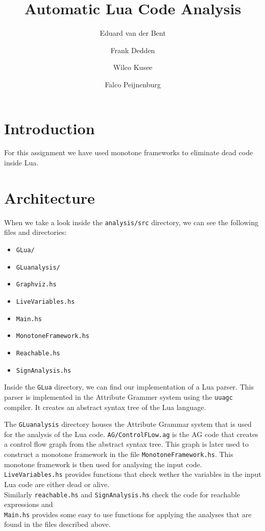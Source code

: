 \documentclass[10pt]{article}
\title{Automatic Lua Code Analysis}
\author{Eduard van der Bent \and Frank Dedden \and Wilco Kusee \and Falco Peijnenburg}
\begin{document}
\maketitle


\section{Introduction}

For this assignment we have used monotone frameworks to eliminate dead code inside Lua.

\section{Architecture} %
When we take a look inside the \texttt{analysis/src} directory, we can see the following files and directories:
\begin{itemize}
	\item \texttt{GLua/}
	\item \texttt{GLuanalysis/}
	\item \texttt{Graphviz.hs}
	\item \texttt{LiveVariables.hs}
	\item \texttt{Main.hs}
	\item \texttt{MonotoneFramework.hs}
	\item \texttt{Reachable.hs}
	\item \texttt{SignAnalysis.hs}
\end{itemize}

Inside the \texttt{GLua} directory, we can find our implementation of a Lua parser. This parser is implemented in the Attribute Grammer system using the \texttt{uuagc} compiler. It creates an abstract syntax tree of the Lua language. %

The \texttt{GLuanalysis} directory houses the Attribute Grammar system that is used for the analysis of the Lua code. \texttt{AG/ControlFLow.ag} is the AG code that creates a control flow graph from the abstract syntax tree. This graph is later used to construct a monotone framework in the file \texttt{MonotoneFramework.hs}. This monotone framework is then used for analysing the input code.\\
\texttt{LiveVariables.hs} provides functions that check wether the variables in the input Lua code are either dead or alive.\\
Similarly \texttt{reachable.hs} and \texttt{SignAnalysis.hs} check the code for reachable expressions and %
\\
\texttt{Main.hs} provides some easy to use functions for applying the analyses that are found in the files described above.
\end{document}
